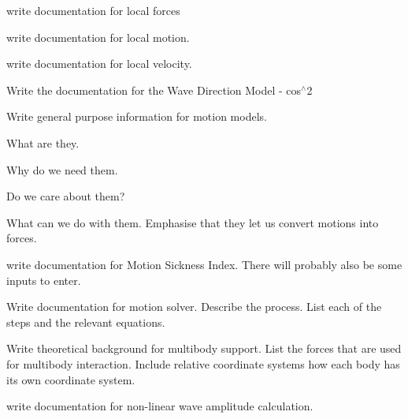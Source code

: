 \begin{DoxyRefList}
\item[\label{todo__todo000019}%
\hypertarget{todo__todo000019}{}%
Page \hyperlink{local_force}{Local Forces} ]write documentation for local forces 
\item[\label{todo__todo000020}%
\hypertarget{todo__todo000020}{}%
Page \hyperlink{local_motion}{Local Motion} ]write documentation for local motion. 
\item[\label{todo__todo000023}%
\hypertarget{todo__todo000023}{}%
Page \hyperlink{local_velocity}{Local Velocity} ]write documentation for local velocity. 
\item[\label{todo__todo000030}%
\hypertarget{todo__todo000030}{}%
Page \hyperlink{cos_square_model}{Model Cos$^\wedge$2 Wave Direction Model} ]Write the documentation for the Wave Direction Model -\/ cos$^\wedge$2 
\item[\label{todo__todo000008}%
\hypertarget{todo__todo000008}{}%
Page \hyperlink{motion_models}{Motion Models} ]Write general purpose information for motion models.
\begin{DoxyItemize}
\item What are they.
\item Why do we need them.
\item Do we care about them?
\item What can we do with them. Emphasise that they let us convert motions into forces. 
\end{DoxyItemize}
\item[\label{todo__todo000021}%
\hypertarget{todo__todo000021}{}%
Page \hyperlink{local_msi}{Motion Sickness Index} ]write documentation for Motion Sickness Index. There will probably also be some inputs to enter. 
\item[\label{todo__todo000009}%
\hypertarget{todo__todo000009}{}%
Page \hyperlink{motion_solver}{Motion Solver} ]Write documentation for motion solver. Describe the process. List each of the steps and the relevant equations. 
\item[\label{todo__todo000001}%
\hypertarget{todo__todo000001}{}%
Page \hyperlink{multibody_support}{Multibody Support} ]Write theoretical background for multibody support. List the forces that are used for multibody interaction. Include relative coordinate systems how each body has its own coordinate system. 
\item[\label{todo__todo000047}%
\hypertarget{todo__todo000047}{}%
Page \hyperlink{non-linear_wave}{Non-\/\-Linear Wave Amplitude Calculation} ]write documentation for non-\/linear wave amplitude calculation. 

\end{DoxyRefList}
